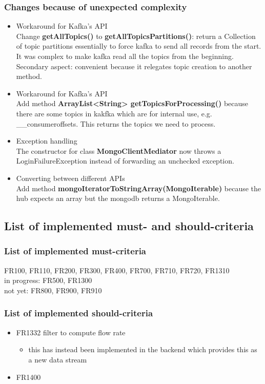 \documentclass[oneside, english, final]{design}
\begin{document}
\subsubsection{Changes because of unexpected complexity}
\begin{itemize}
  \item{Workaround for Kafka's API}
    \\
    Change \textsf{\textbf{getAllTopics()}} to \textsf{\textbf{getAllTopicsPartitions()}}:
    return a Collection of topic partitions essentially to force kafka to send all records from the start.
    It was complex to make kafka read all the topics from the beginning.
    Secondary aspect: convenient because it relegates topic creation to another method.

  \item{Workaround for Kafka's API}
    \\
    Add method \textsf{\textbf{ArrayList<String> getTopicsForProcessing()}}
  because there are some topics in kakfka which are for internal use, e.g. \_\_consumeroffsets.
 This returns the topics we need to process.
	
  \item{Exception handling}
    \\ 
    The constructor for class \textsf{\textbf{MongoClientMediator}} now throws a LoginFailureException instead of forwarding an unchecked exception.

  \item{Converting between different APIs}
    \\ 
    Add method \textsf{\textbf{mongoIteratorToStringArray(MongoIterable)}}
    because the hub expects an array but the mongodb returns a MongoIterable.

\end{itemize}


\subsection{List of implemented must- and should-criteria}
\subsubsection{List of implemented must-criteria}
FR100, FR110, FR200, FR300, FR400, FR700, FR710, FR720, FR1310
\\
in progress: FR500, FR1300
\\
not yet: FR800, FR900, FR910

\subsubsection{List of implemented should-criteria}
\begin{itemize}
  \item{FR1332 filter to compute flow rate}
  \begin{itemize}
    \item{this has instead been implemented in the backend which provides this as a new data stream}
  \end{itemize}
  \item{FR1400}
\end{itemize}
\end{document}
